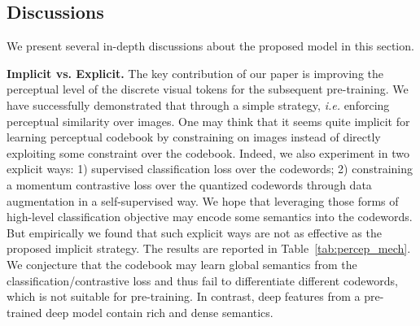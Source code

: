 \documentclass[letterpaper]{article} \usepackage{aaai23}  \usepackage{times}  \usepackage{helvet}  \usepackage{courier}  \usepackage[hyphens]{url}  \usepackage{graphicx} \urlstyle{rm} \def\UrlFont{\rm}  \usepackage{natbib}  \usepackage{caption} \frenchspacing  \setlength{\pdfpagewidth}{8.5in}  \setlength{\pdfpageheight}{11in}  \usepackage{algorithm}
\newcommand{\ie}{\textit{i.e. }}
\begin{document}
\begin{table}[t]
\centering
\small
{}
\caption{Performance comparison of our implicit way (perceptual loss on images) and the explicit ways (classification/conrastive loss on codewords) for improving the perceptual level of codebook.}\label{tab:percep_mech}
\end{table}





\subsection{Discussions}
We present several in-depth discussions about the proposed model in this section.

\noindent \textbf{Implicit vs. Explicit.}
The key contribution of our paper is improving the perceptual level of the discrete visual tokens for the subsequent pre-training.
We have successfully demonstrated that through a simple strategy, \ie enforcing perceptual similarity over images.
One may think that it seems quite implicit for learning perceptual codebook by constraining on images instead of directly exploiting some constraint over the codebook.
Indeed, we also experiment in two explicit ways:
1) supervised classification loss over the codewords; 2) constraining a momentum contrastive loss over the quantized codewords through data augmentation in a self-supervised way. 
We hope that leveraging those forms of high-level classification objective
may encode some semantics into the codewords. 
But empirically we found that such explicit ways are not as effective as the proposed implicit strategy.
The results are reported in Table~\ref{tab:percep_mech}.
We conjecture that the codebook may learn global semantics from the classification/contrastive loss and thus fail to differentiate different codewords, which is not suitable for pre-training.
In contrast, deep features from a pre-trained deep model contain rich and dense semantics.
\end{document}
